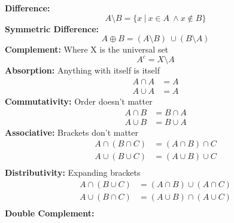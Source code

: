 \documentclass[a4paper,10pt]{article}
\begin{document}
\newline
\textcolor{BlueGreen}{\textbf{Difference:}} \\
\begin{equation*}
A \setminus B = \{ x \ |  \ x \in A \ \land x \notin B\}
\end{equation*}
\newline
\textcolor{BlueGreen}{\textbf{Symmetric Difference:}} \\
\begin{equation*}
A \oplus B = (A \setminus B ) \ \cup (B \setminus A)
\end{equation*}
\newline
\textcolor{BlueGreen}{\textbf{Complement:}} Where X is the universal set \\
\begin{equation*}
A^{c} = X \setminus A
\end{equation*}
\newline
\textcolor{BlueGreen}{\textbf{Absorption:}} Anything with itself is itself \\
\begin{align*}
A \cap A &= A \\
A \cup A &= A
\end{align*}
\newline
\textcolor{BlueGreen}{\textbf{Commutativity:}} Order doesn't matter \\
\begin{align*}
A \cap B &= B \cap A \\
A \cup B &= B \cup A 
\end{align*}
\newline
\textcolor{BlueGreen}{\textbf{Associative:}} Brackets don't matter\\
\begin{align*}
A \cap (B \cap C) &= (A \cap B) \cap C\\
A \cup (B \cup C) &= (A \cup B) \cup C \\
\end{align*}
\newline
\textcolor{BlueGreen}{\textbf{Distributivity:}} Expanding brackets \\
\begin{align*}
A \cap (B \cup C) &= (A \cap B) \cup (A \cap C) \\
A \cup (B \cap C) &= (A \cup B) \cap (A \cup C) \\
\end{align*}
\newline
\textcolor{BlueGreen}{\textbf{Double Complement:}} \\
\end{document}
